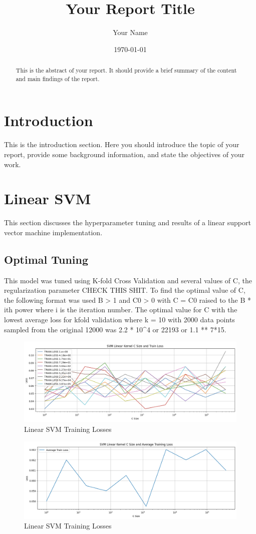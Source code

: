 \documentclass[12pt]{article}
\title{Your Report Title}
\author{Your Name}
\date{\today}
\begin{document}
\maketitle

\begin{abstract}
This is the abstract of your report. It should provide a brief summary of the content and main findings of the report.
\end{abstract}

\section{Introduction}
This is the introduction section. Here you should introduce the topic of your report, provide some background information, and state the objectives of your work.

\section{Linear SVM }

This section discusses the hyperparameter tuning and results of a linear support vector machine implementation. 

\subsection{Optimal Tuning}
This model was tuned using K-fold Cross Validation and several values of C, the regularization parameter CHECK THIS SHIT. 
To find the optimal value of C, the following format was used B > 1 and C0 > 0 with C = C0 raised to the B * ith power where i is the iteration number. The optimal value for C with the lowest average loss for kfold validation where k = 10 with 2000 data points sampled from the original 12000 was 2.2 * 10^4 or 22193 or 1.1 ** 7*15.

\begin{figure}
    \includegraphics[width=0.2\linewidth]{Assets/LinearSVM_TrainLosses.png}
    \centering
    \caption{Linear SVM Training Losses}
\end{figure}

\begin{figure}
    \includegraphics[width=0.2\linewidth]{Assets/LinearSVM_AVGTrainLoss.png}
    \centering
    \caption{Linear SVM Training Losses}
\end{figure}
\end{document}
